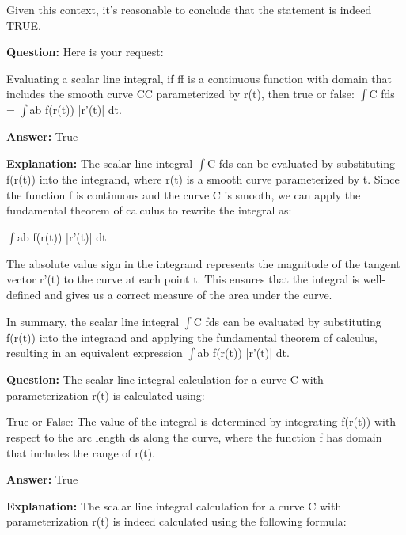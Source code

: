 \documentclass{article}
\begin{document}
Given this context, it's reasonable to conclude that the statement is indeed TRUE.
                
                \vspace{0.5cm} 
        
            
                \textbf {Question:} Here is your request:

Evaluating a scalar line integral, if ff is a continuous function with domain that includes the smooth curve CC parameterized by r(t), then true or false: \ensuremath{\int}C fds = \ensuremath{\int}ab f(r(t)) |r'(t)| dt.
                
                \textbf{Answer:} True

                \textbf{Explanation:} The scalar line integral \ensuremath{\int}C fds can be evaluated by substituting f(r(t)) into the integrand, where r(t) is a smooth curve parameterized by t. Since the function f is continuous and the curve C is smooth, we can apply the fundamental theorem of calculus to rewrite the integral as:

\ensuremath{\int}ab f(r(t)) |r'(t)| dt

The absolute value sign in the integrand represents the magnitude of the tangent vector r'(t) to the curve at each point t. This ensures that the integral is well-defined and gives us a correct measure of the area under the curve.

In summary, the scalar line integral \ensuremath{\int}C fds can be evaluated by substituting f(r(t)) into the integrand and applying the fundamental theorem of calculus, resulting in an equivalent expression \ensuremath{\int}ab f(r(t)) |r'(t)| dt.
                
                \vspace{0.5cm} 
        
            
                \textbf {Question:} The scalar line integral calculation for a curve C with parameterization r(t) is calculated using:

True or False: The value of the integral is determined by integrating f(r(t)) with respect to the arc length ds along the curve, where the function f has domain that includes the range of r(t).
                
                \textbf{Answer:} True

                \textbf{Explanation:} The scalar line integral calculation for a curve C with parameterization r(t) is indeed calculated using the following formula:
\end{document}
